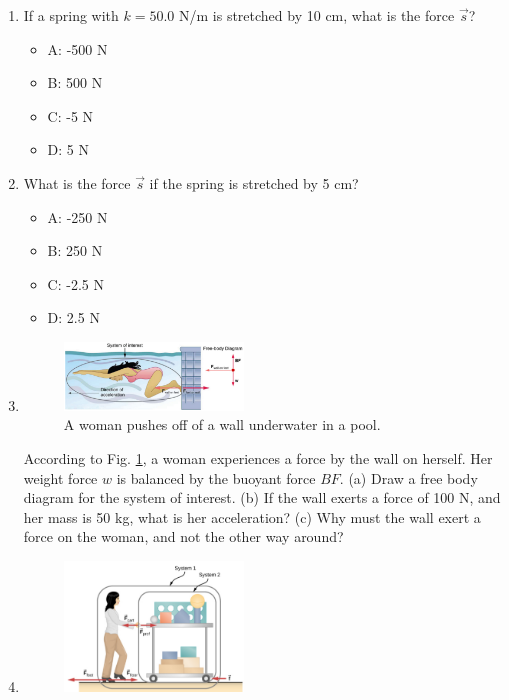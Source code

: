 \documentclass{article}
\begin{document}
\begin{enumerate}
\item If a spring with $k = 50.0$ N/m is stretched by 10 cm, what is the force $\vec{s}$?
\begin{itemize}
\item A: -500 N
\item B: 500 N
\item C: -5 N
\item D: 5 N
\end{itemize}
\item What is the force $\vec{s}$ if the spring is stretched by 5 cm?
\begin{itemize}
\item A: -250 N
\item B: 250 N
\item C: -2.5 N
\item D: 2.5 N
\end{itemize}
\item 
\begin{figure}[ht]
\centering
\includegraphics[width=0.45\textwidth,trim=0cm 0cm 4.75cm 2cm,clip=true]{figures/wall.png}
\caption{\label{fig:wall} A woman pushes off of a wall underwater in a pool.}
\end{figure}
According to Fig. \ref{fig:wall}, a woman experiences a force by the wall on herself.  Her weight force $w$ is balanced by the buoyant force $BF$.  (a) Draw a free body diagram for the system of interest.  (b) If the wall exerts a force of 100 N, and her mass is 50 kg, what is her acceleration? (c) Why must the wall exert a force on the woman, and not the other way around?  \\ \vspace{2.5cm}
\item 
\begin{figure}[ht]
\centering
\includegraphics[width=0.45\textwidth]{figures/cart.png}

\end{figure}
\end{enumerate}
\end{document}
